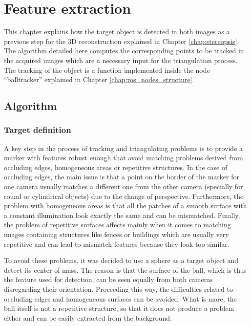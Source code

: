 \chapter{Feature extraction} %
\label{chap:feature_extraction}
This chapter explains how the target object is detected in both images as a previous step for the 3D reconstruction explained in Chapter \ref{chap:stereopsis}. The algorithm detailed here computes the corresponding points to be tracked in the acquired images which are a necessary input for the triangulation process.
The tracking of the object is a function implemented inside the node ``balltracker'' explained in Chapter \ref{chap:ros_nodes_structure}.

\section{Algorithm}

\subsection{Target definition}
A key step in the process of tracking and triangulating problems is to provide a marker with features robust enough that avoid matching problems derived from occluding edges, homogeneous areas or repetitive structures.
In the case of occluding edges, the main issue is that a point on the border of the marker for one camera usually matches a different one from the other camera (specially for round or cylindrical objects) due to the change of perspective.
Furthermore, the problem with homogeneous areas is that all the patches of a smooth surface with a constant illumination look exactly the same and can be mismatched.
Finally, the problem of repetitive surfaces affects mainly when it comes to matching images containing structures like fences or buildings which are usually very repetitive and can lead to mismatch features because they look too similar.

To avoid these problems, it was decided to use a sphere as a target object and detect its center of mass.
The reason is that the surface of the ball, which is thus the feature used for detection, can be seen equally from both cameras disregarding their orientation.
Proceeding this way, the difficulties related to occluding edges and homogeneous surfaces can be avoided.
What is more, the ball itself is not a repetitive structure, so that it does not produce a problem either and can be easily extracted from the background.

